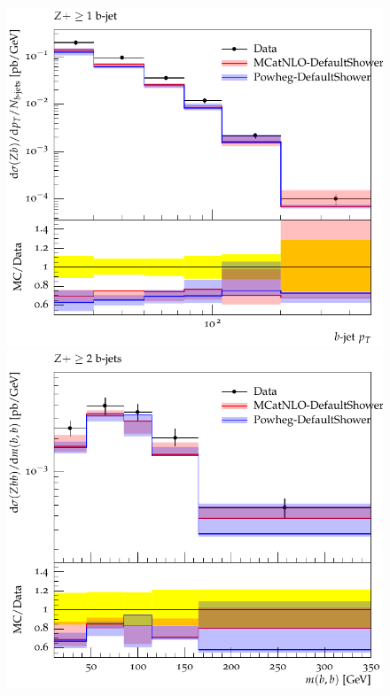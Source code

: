 \documentclass[11pt]{cernrep}
\begin{document}
\begin{figure}[htbp]
\begin{center}
   \includegraphics[scale=0.65]{figs/zbb/herwig4F/d03-x01-y01.pdf} 
   \includegraphics[scale=0.65]{figs/zbb/herwig4F/d23-x01-y01.pdf} \\

\end{center}
\end{figure}
\end{document}
